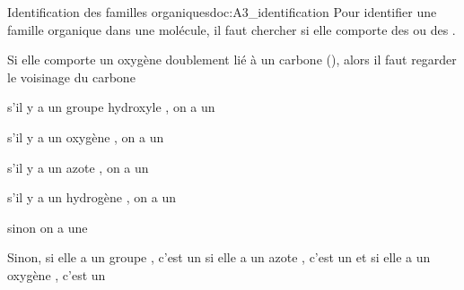 \begin{doc}{Identification des familles organiques}{doc:A3_identification}
  Pour identifier une famille organique dans une molécule, il faut chercher si elle comporte des  ou des . 
  
  Si elle comporte un oxygène  doublement lié à un carbone (), alors il faut regarder le voisinage du carbone
  \begin{listePoints}
      \item s'il y a un groupe hydroxyle , on a un 
      \item s'il y a un oxygène , on a un 
      \item s'il y a un azote , on a un 
      \item s'il y a un hydrogène , on a un 
      \item sinon on a une 
  \end{listePoints}
  Sinon, si elle a un groupe , c'est un  si elle a un azote , c'est un  et si elle a un oxygène , c'est un 
\end{doc}
